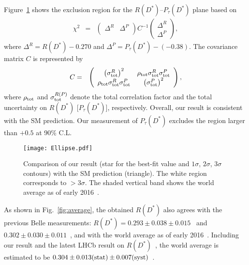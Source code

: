 \documentclass[aps,prd,twocolumn,superscriptaddress,showpacs,preprintnumbers,amsmath,amssymb]{revtex4-1}
\begin{document}
Figure~\ref{fig:ellipse} shows the exclusion region for the $R(D^*)$--$P_\tau(D^*)$ plane based on
\begin{eqnarray}
  \chi^2 &=& \left(
  \begin{array}{cc}
    \Delta^R & \Delta^P\\
  \end{array}
  \right)
  C^{-1}
  \left(
  \begin{array}{c}
    \Delta^R\\
    \Delta^P
  \end{array}
  \right),
\end{eqnarray}
where $\Delta^R = R(D^*) - 0.270$ and $\Delta^P = P_\tau(D^*) - (-0.38)$. The covariance matrix $C$ is represented by
\begin{eqnarray}
  C &=& \left(
  \begin{array}{cc}
    \left( \sigma_{\rm tot}^R \right)^2 & \rho_{\rm tot} \sigma_{\rm tot}^R \sigma_{\rm tot}^P\\
    \rho_{\rm tot} \sigma_{\rm tot}^R \sigma_{\rm tot}^P & \left( \sigma_{\rm tot}^P \right)^2\\
  \end{array}
  \right),
\end{eqnarray}
where $\rho_{\rm tot}$ and $\sigma_{\rm tot}^{R(P)}$ denote the total correlation factor and the total uncertainty on $R(D^*)$ [$P_\tau(D^*)$], respectively. Overall, our result is consistent with the SM prediction. Our measurement of $P_\tau(D^*)$ excludes the region larger than $+0.5$ at 90\% C.L.

\begin{figure}[t!]
  \centering
  \texttt{[image: Ellipse.pdf]}
  \caption{Comparison of our result (star for the best-fit value and $1\sigma$, $2\sigma$, $3\sigma$ contours) with the SM prediction (triangle). The white region corresponds to $>3\sigma$. The shaded vertical band shows the world average as of early 2016~\cite{cite:HFLAV:2014}.}
  \label{fig:ellipse}
\end{figure}

As shown in Fig.~\ref{fig:average}, the obtained $R(D^*)$ also agrees with the previous Belle measurements: $R(D^*) = 0.293 \pm 0.038 \pm 0.015$~\cite{cite:Belle:2015} and $0.302 \pm 0.030 \pm 0.011$~\cite{cite:Belle:2016}, and with the world average as of early 2016~\cite{cite:HFLAV:2014}. Including our result and the latest LHCb result on $R(D^*)$~\cite{cite:LHCb:2017}, the world average is estimated to be $0.304 \pm 0.013 ({\rm stat}) \pm 0.007 ({\rm syst})$~\cite{cite:HFLAV:2016}.
\end{document}
